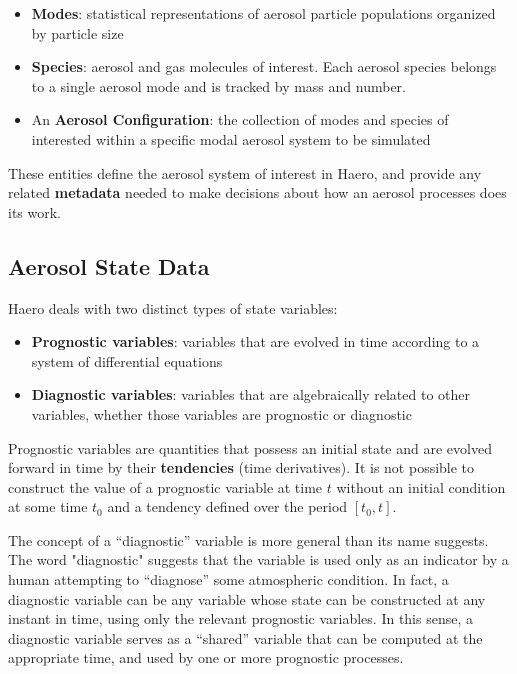 \begin{itemize}
  \item {\bf Modes}: statistical representations of aerosol particle populations
        organized by particle size
  \item {\bf Species}: aerosol and gas molecules of interest. Each aerosol
        species belongs to a single aerosol mode and is tracked by mass and
        number.
  \item An {\bf Aerosol Configuration}: the collection of modes and species of
        interested within a specific modal aerosol system to be simulated
\end{itemize}

These entities define the aerosol system of interest in Haero, and provide
any related {\bf metadata} needed to make decisions about how an aerosol
processes does its work.

\subsection{Aerosol State Data}

Haero deals with two distinct types of state variables:

\begin{itemize}
  \item {\bf Prognostic variables}: variables that are evolved in time according
        to a system of differential equations
  \item {\bf Diagnostic variables}: variables that are algebraically related to
        other variables, whether those variables are prognostic or diagnostic
\end{itemize}

Prognostic variables are quantities that possess an initial state and are
evolved forward in time by their {\bf tendencies} (time derivatives). It is
not possible to construct the value of a prognostic variable at time $t$ without
an initial condition at some time $t_0$ and a tendency defined over the period
$\left[t_0, t\right]$.

The concept of a ``diagnostic'' variable is more general than its name suggests.
The word "diagnostic" suggests that the variable is used only as an indicator
by a human attempting to ``diagnose'' some atmospheric condition. In fact, a
diagnostic variable can be any variable whose state can be constructed at any
instant in time, using only the relevant prognostic variables. In this sense,
a diagnostic variable serves as a ``shared'' variable that can be computed at
the appropriate time, and used by one or more prognostic processes.


